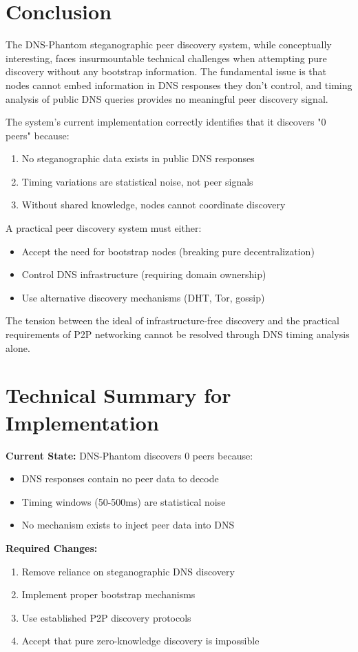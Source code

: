 \documentclass[12pt,a4paper]{article}
\begin{document}
\section{Conclusion}

The DNS-Phantom steganographic peer discovery system, while conceptually interesting, faces insurmountable technical challenges when attempting pure discovery without any bootstrap information. The fundamental issue is that nodes cannot embed information in DNS responses they don't control, and timing analysis of public DNS queries provides no meaningful peer discovery signal.

The system's current implementation correctly identifies that it discovers "0 peers" because:
\begin{enumerate}
    \item No steganographic data exists in public DNS responses
    \item Timing variations are statistical noise, not peer signals
    \item Without shared knowledge, nodes cannot coordinate discovery
\end{enumerate}

A practical peer discovery system must either:
\begin{itemize}
    \item Accept the need for bootstrap nodes (breaking pure decentralization)
    \item Control DNS infrastructure (requiring domain ownership)
    \item Use alternative discovery mechanisms (DHT, Tor, gossip)
\end{itemize}

The tension between the ideal of infrastructure-free discovery and the practical requirements of P2P networking cannot be resolved through DNS timing analysis alone.

\section{Technical Summary for Implementation}

\textbf{Current State:} DNS-Phantom discovers 0 peers because:
\begin{itemize}
    \item DNS responses contain no peer data to decode
    \item Timing windows (50-500ms) are statistical noise
    \item No mechanism exists to inject peer data into DNS
\end{itemize}

\textbf{Required Changes:}
\begin{enumerate}
    \item Remove reliance on steganographic DNS discovery
    \item Implement proper bootstrap mechanisms
    \item Use established P2P discovery protocols
    \item Accept that pure zero-knowledge discovery is impossible
\end{enumerate}
\end{document}
